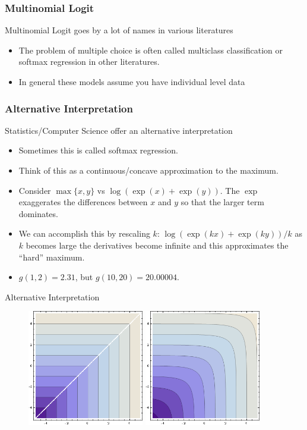 \documentclass[xcolor=pdftex,dvipsnames,table,mathserif]{beamer}
\begin{document}
\begin{frame}
\frametitle{Multinomial Logit}
Multinomial Logit goes by a lot of names in various literatures
\begin{itemize}
\item The problem of multiple choice is often called \alert{multiclass classification} or \alert{softmax regression} in other literatures.
\item In general these models assume you have individual level data
\end{itemize}
\end{frame}

\begin{frame}
\frametitle{Alternative Interpretation}
Statistics/Computer Science offer an alternative interpretation
\begin{itemize}
\item Sometimes this is called \alert{softmax} regression.
\item Think of this as a continuous/concave approximation to the maximum.
\item Consider $\max\{x,y\}$ vs $\log(\exp(x) + \exp(y))$. The $\exp$ exaggerates the differences between $x$ and $y$ so that the larger term dominates.
\item We can accomplish this by rescaling $k$:  $\log(\exp(kx) + \exp(ky))/k$ as $k$ becomes large the derivatives become infinite and this approximates the ``hard'' maximum.
\item $g(1, 2) = 2.31$, but $g(10, 20) = 20.00004$.
\end{itemize}
\end{frame}

\begin{frame}{Alternative Interpretation}
\begin{figure}[htbp]
\begin{center}
\includegraphics[width=2in]{./resources/hardmax.png}
\includegraphics[width=2in]{./resources/softmax.png}
\end{center}
\end{figure}
\end{frame}
\end{document}
